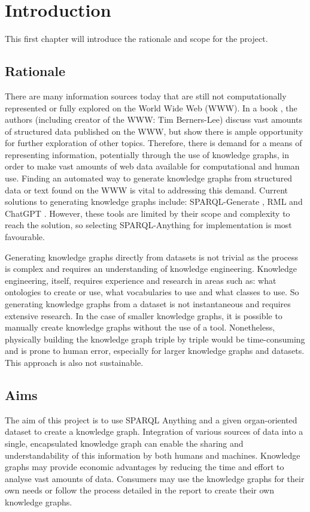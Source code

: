 \chapter{Introduction}
This first chapter will introduce the rationale and scope for the project.

\section{Rationale}
There are many information sources today that are still not computationally represented or fully explored on the World Wide Web (WWW). In a book \cite{bizer2011linked}, the authors (including creator of the WWW: Tim Berners-Lee) discuss vast amounts of structured data published on the WWW, but show there is ample opportunity for further exploration of other topics. Therefore, there is demand for a means of representing information, potentially through the use of knowledge graphs, in order to make vast amounts of web data available for computational and human use. Finding an automated way to generate knowledge graphs from structured data or text found on the WWW is vital to addressing this demand. Current solutions to generating knowledge graphs include: SPARQL-Generate \cite{sparqlgenerate}, RML \cite{rml} and ChatGPT \cite{chatgptwebsite}. However, these tools are limited by their scope and complexity to reach the solution, so selecting SPARQL-Anything \cite{sparqlanythinggithub} for implementation is most favourable. 

Generating knowledge graphs directly from datasets is not trivial as the process is complex and requires an understanding of knowledge engineering. Knowledge engineering, itself, requires experience and research in areas such as: what ontologies to create or use, what vocabularies to use and what classes to use. So generating knowledge graphs from a dataset is not instantaneous and requires extensive research. In the case of smaller knowledge graphs, it is possible to manually create knowledge graphs without the use of a tool. Nonetheless, physically building the knowledge graph triple by triple would be time-consuming and is prone to human error, especially for larger knowledge graphs and datasets. This approach is also not sustainable. 

\section{Aims}
The aim of this project is to use SPARQL Anything and a given organ-oriented dataset to create a knowledge graph. Integration of various sources of data into a single, encapsulated knowledge graph can enable the sharing and understandability of this information by both humans and machines. Knowledge graphs may provide economic advantages by reducing the time and effort to analyse vast amounts of data. Consumers may use the knowledge graphs for their own needs or follow the process detailed in the report to create their own knowledge graphs.

